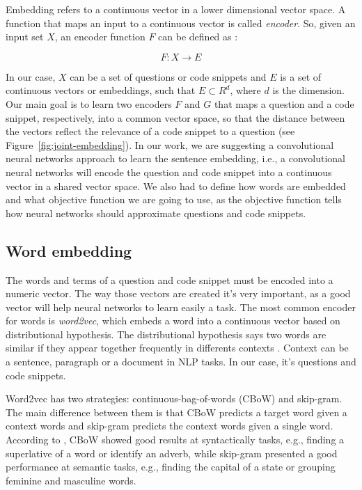 \documentclass[sigconf]{acmart}
\begin{document}
Embedding refers to a continuous vector in a lower dimensional vector space. A function that maps an input to a continuous vector is called \emph{encoder}. So, given an input set $X$, an encoder function $F$ can be defined as \cite{cambronero-deep-code-search-2019}:

\begin{equation}
    F: X \to E
\end{equation}

In our case, $X$ can be a set of questions or code snippets and $E$ is a set of continuous vectors or embeddings, such that $E \subset R^{d}$, where $d$ is the dimension. Our main goal is to learn two encoders $F$ and $G$ that maps a question and a code snippet, respectively, into a common vector space, so that the distance between the vectors reflect the relevance of a code snippet to a question (see Figure~\ref{fig:joint-embedding}). In our work, we are suggesting a convolutional neural networks approach to learn the sentence embedding, i.e., a convolutional neural networks will encode the question and code snippet into a continuous vector in a shared vector space. We also had to define how words are embedded and what objective function we are going to use, as the objective function tells how neural networks should approximate questions and code snippets.

\subsection{Word embedding}

The words and terms of a question and code snippet must be encoded into a numeric vector. The way those vectors are created it's very important, as a good vector will help neural networks to learn easily a task. The most common encoder for words is \emph{word2vec}, which embeds a word into a continuous vector based on distributional hypothesis. The distributional hypothesis says two words are similar if they appear together frequently in differents contexts \citep{Goodfellow-et-al-2016}. Context can be a sentence, paragraph or a document in NLP tasks. In our case, it's questions and code snippets.

Word2vec has two strategies: continuous-bag-of-words (CBoW) and skip-gram. The main difference between them is that CBoW predicts a target word given a context words and skip-gram predicts the context words given a single word. According to \cite{mikolov2013distributed}, CBoW showed good results at syntactically tasks, e.g., finding a superlative of a word or identify an adverb, while skip-gram presented a good performance at semantic tasks, e.g., finding the capital of a state or grouping feminine and masculine words. 
\end{document}

